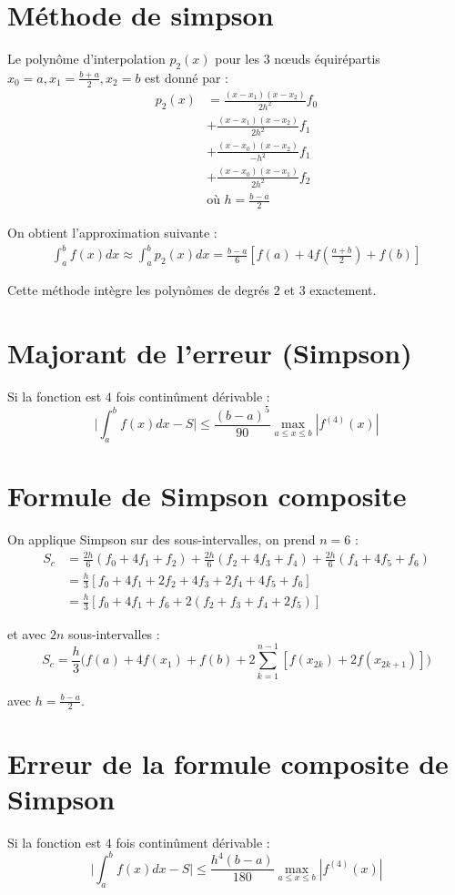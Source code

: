 \documentclass[a4paper,9pt]{extarticle}
\begin{document}
\begin{multicols*}{2}
\section{Méthode de simpson}
Le polynôme d'interpolation $p_2(x)$ pour les 3 nœuds équirépartis $x_0=a,x_1=\frac{b+a}{2},x_2=b$ est donné par :
\begin{align*}
p_2(x)&=\frac{(x-x_1)(x-x_2)}{2h^2}f_0\\
&+\frac{(x-x_1)(x-x_2)}{2h^2}f_1\\
&+\frac{(x-x_0)(x-x_2)}{-h^2}f_1\\
&+\frac{(x-x_0)(x-x_1)}{2h^2}f_2\\
& \text{où } h=\frac{b-a}{2}
\end{align*}

On obtient l'approximation suivante :
\begin{align*}
\int_a^bf(x)dx \approx \int_a^bp_2(x)dx = \frac{b-a}{6}[f(a)+4f(\frac{a+b}{2})+f(b)]
\end{align*}

Cette méthode intègre les polynômes de degrés $2$ et $3$ exactement.

\section{Majorant de l'erreur (Simpson)}
Si la fonction est $4$ fois continûment dérivable :
$$
\Big|\int_a^bf(x)dx-S\Big| \leq \frac{(b-a)^5}{90}\max_{a\leq x\leq b}|f^{(4)}(x)|
$$

\section{Formule de Simpson composite}

On applique Simpson sur des sous-intervalles, on prend $n=6$ :
\begin{align*}
S_c
 &=\frac{2h}{6}(f_0+4f_1+f_2)+\frac{2h}{6}(f_2+4f_3+f_4)+\frac{2h}{6}(f_4+4f_5+f_6)\\
 &=\frac{h}{3}[f_0+4f_1+2f_2+4f_3+2f_4+4f_5+f_6]\\
 &=\frac{h}{3}[f_0+4f_1+f_6+2(f_2+f_3+f_4+2f_5)]
\end{align*}

et avec $2n$ sous-intervalles :
$$
S_c=\frac{h}{3}\Big(f(a)+4f(x_1)+f(b)+2\sum_{k=1}^{n-1}[f(x_{2k})+2f(x_{2k+1})]\Big)
$$

avec $h=\frac{b-a}{2}$.

\section{Erreur de la formule composite de Simpson}
Si la fonction est $4$ fois continûment dérivable :
$$
\Big|\int_a^bf(x)dx-S\Big| \leq \frac{h^4(b-a)}{180}\max_{a\leq x \leq b}|f^{(4)}(x)|
$$


\end{multicols*}
\end{document}
